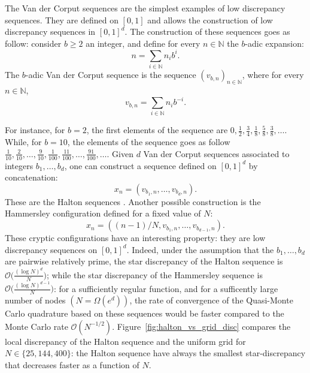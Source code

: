 \documentclass[twoside,11pt]{book}
\newtheorem{definition}{Definition}
\numberwithin{theorem}{chapter}
\numberwithin{definition}{chapter}
\numberwithin{proposition}{chapter}
\numberwithin{corollary}{chapter}
\numberwithin{example}{chapter}
\numberwithin{lemma}{chapter}
\begin{document}
The Van der Corput sequences are the simplest examples of low discrepancy sequences. They are defined on $[0,1]$ and allows the construction of low discrepancy sequences in $[0,1]^{d}$.
The construction of these sequences goes as follow: consider $b \geq 2$ an integer, and define for every $n \in \mathbb{N}$ the $b$-adic expansion:
\begin{equation}
n = \sum\limits_{i \in \mathbb{N}} n_{i}b^{i}.
\end{equation} 
The $b$-adic Van der Corput sequence is the sequence $(v_{b,n})_{n \in \mathbb{N}}$, where for every $n \in \mathbb{N}$, 
\begin{equation}
v_{b,n} = \sum\limits_{i \in \mathbb{N}} n_{i}b^{-i}. 
\end{equation}


For instance, for $b = 2$, the first elements of the sequence are $\displaystyle 0, \frac{1}{2}, \frac{3}{4}, \frac{1}{8}, \frac{5}{8}, \frac{3}{8}, \dots$. While, for $b=10$, the elements of the sequence goes as follow $\displaystyle \frac{1}{10}, \frac{2}{10}, \dots, \frac{9}{10}, \frac{1}{100}, \frac{11}{100}, \dots ,\frac{91}{100}, \dots$.
Given $d$ Van der Corput sequences associated to integers $b_{1}, \dots , b_{d}$, one can construct a sequence defined on $[0,1]^{d}$ by concatenation:
\begin{equation}
x_{n} = (v_{b_1,n}, \dots, v_{b_d,n}).
\end{equation}
These are the Halton sequences \citep{Hal64}. Another possible construction is the Hammersley configuration defined for a fixed value of $N$:
\begin{equation}
x_{n} = ((n-1)/N,v_{b_1,n}, \dots, v_{b_{d-1},n}).
\end{equation}
These cryptic configurations have an interesting property: they are low discrepancy sequences on $[0,1]^{d}$. Indeed, under the assumption that the $b_{1}, \dots, b_{d}$ are pairwise relatively prime, the star discrepancy of the Halton sequence is $\displaystyle \mathcal{O}\bigg(\frac{(\log N)^{d}}{N} \bigg)$; while the star discrepancy of the Hammersley sequence is $\displaystyle \mathcal{O} \bigg(\frac{(\log N)^{d-1}}{N} \bigg)$: for a sufficiently regular function, and for a sufficently large number of nodes $(N = \Omega(e^{d}))$, the rate of convergence of the Quasi-Monte Carlo quadrature based on these sequences would be faster compared to the Monte Carlo rate $\mathcal{O}(N^{-1/2})$. Figure~\ref{fig:halton_vs_grid_disc} compares the local discrepancy of the Halton sequence and the uniform grid for $N \in \{25,144,400\}$: the Halton sequence have always the smallest star-discrepancy that decreases faster as a function of $N$. 
\end{document}
